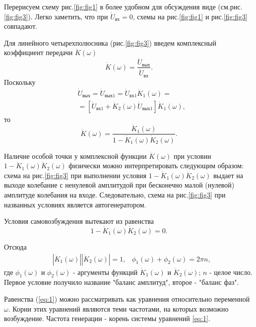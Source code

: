Перерисуем схему рис.\ref{fig:fig1} в более удобном для обсуждения виде (см.рис.\ref{fig:fig3}). Легко заметить, что при $\dot{U}_\text{вх}=0$, схемы на рис.\ref{fig:fig1} и рис.\ref{fig:fig3} совпадают.

Для линейного четырехполюсника (рис.\ref{fig:fig3}) введем комплексный коэффициент передачи $\dot{K}(\omega)$
\begin{equation*}
\dot{K}(\omega)=\frac{\dot{U}_\text{вых}}{\dot{U}_\text{вх}}.
\end{equation*}
Поскольку
\begin{equation*}
\begin{aligned}
&\dot{U}_\text{вых}=\dot{U}_{\text{вых}1}=\dot{U}_{\text{вх}1}\dot{K}_1(\omega)=\\
&= [\dot{U}_{\text{вх}1}+\dot{K}_2(\omega)\dot{U}_{\text{вых}1}]\dot{K}_1(\omega),
\end{aligned}
\end{equation*}
то 
\begin{equation*}
\dot{K}(\omega)=\frac{\dot{K}_1(\omega)}{1-\dot{K}_1(\omega)\dot{K}_2(\omega)}.
\end{equation*}

Наличие особой точки у комплексной функции $\dot{K}(\omega)$ при условии $1-\dot{K}_1(\omega)\dot{K}_2(\omega)$ физически можно интерпретировать следующим образом: схема на рис.\ref{fig:fig3} при выполнении условия $1-\dot{K}_1(\omega)\dot{K}_2(\omega)$ выдает на выходе колебание с ненулевой амплитудой при бесконечно малой (нулевой) амплитуде колебания на входе. Следовательно, схема  на рис.\ref{fig:fig3} при названных условиях является автогенератором.

Условия самовозбуждения вытекают из равенства
\begin{equation*}
1-\dot{K}_1(\omega)\dot{K}_2(\omega)=0.
\end{equation*}

Отсюда 
\begin{equation}
\begin{aligned}
& |\dot{K}_1(\omega)||\dot{K}_2(\omega)|=1, & \phi_1(\omega)+\phi_2(\omega)=2\pi n,
\end{aligned}
\label{eq:1}
\end{equation}
где $\phi_1(\omega)$ и $\phi_2(\omega)$ - аргументы функций $\dot{K}_1(\omega)$ и $\dot{K}_2(\omega)$; $n$ - целое число. Первое условие получило название "баланс амплитуд", второе - "баланс фаз".

Равенства (\ref{eq:1}) можно рассматривать как уравнения относительно переменной $\omega$. Корни этих уравнений являются теми частотами, на которых возможно возбуждение. Частота генерации - корень системы уравнений \eqref{eq:1}.

